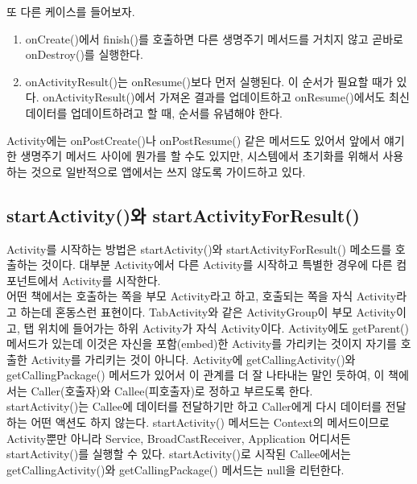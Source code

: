 또 다른 케이스를 들어보자.
\begin{enumerate}
\item onCreate()에서 finish()를 호출하면 다른 생명주기 메서드를 거치지 않고 곧바로 onDestroy()를 실행한다.
\item onActivityResult()는 onResume()보다 먼저 실행된다.
이 순서가 필요할 때가 있다. onActivityResult()에서 가져온 결과를 업데이트하고
onResume()에서도 최신 데이터를 업데이트하려고 할 때, 순서를 유념해야 한다.
\end{enumerate}

Activity에는 onPostCreate()나 onPostResume() 같은 메서드도 있어서 앞에서 얘기한 생명주기 메서드 사이에 뭔가를 할 수도 있지만, 시스템에서 초기화를 위해서 사용하는 것으로 일반적으로 앱에서는 쓰지 않도록 가이드하고 있다.

\subsection{startActivity()와 startActivityForResult()}
Activity를 시작하는 방법은 startActivity()와 startActivityForResult() 메소드를 호출하는 것이다. 대부분 Activity에서 다른 Activity를 시작하고 특별한 경우에 다른 컴포넌트에서 Activity를 시작한다.\\

어떤 책에서는 호출하는 쪽을 부모 Activity라고 하고, 호출되는 쪽을 자식 Activity라고 하는데 혼동스런 표현이다. TabActivity와 같은 ActivityGroup이 부모 Activity이고, 탭 위치에 들어가는 하위 Activity가 자식 Activity이다. Activity에도 getParent() 메서드가 있는데 이것은 자신을 포함(embed)한 Activity를 가리키는 것이지 자기를 호출한 Activity를 가리키는 것이 아니다. 
Activity에 getCallingActivity()와 getCallingPackage() 메서드가 있어서 이 관계를 더 잘 나타내는 말인 듯하여, 이 책에서는 Caller(호출자)와 Callee(피호출자)로 정하고 부르도록 한다.\\

startActivity()는 Callee에 데이터를 전달하기만 하고 Caller에게 다시 데이터를 전달하는 어떤 액션도 하지 않는다.
startActivity() 메서드는 Context의 메서드이므로 Activity뿐만 아니라 Service, BroadCastReceiver, Application 어디서든 startActivity()를 실행할 수 있다.
startActivity()로 시작된 Callee에서는 getCallingActivity()와 getCallingPackage() 메서드는 null을 리턴한다.


